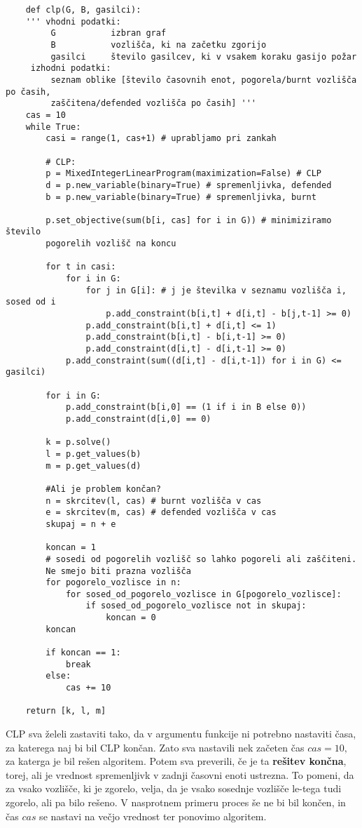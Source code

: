 \documentclass[a4paper, 12pt]{article}
\begin{document}
\overfullrule=0pt
\begin{verbatim}
    def clp(G, B, gasilci):
    ''' vhodni podatki:
         G           izbran graf
         B           vozlišča, ki na začetku zgorijo
         gasilci     število gasilcev, ki v vsakem koraku gasijo požar
     izhodni podatki:
         seznam oblike [število časovnih enot, pogorela/burnt vozlišča po časih, 
         zaščitena/defended vozlišča po časih] '''
    cas = 10
    while True:
        casi = range(1, cas+1) # uprabljamo pri zankah
    
        # CLP:
        p = MixedIntegerLinearProgram(maximization=False) # CLP
        d = p.new_variable(binary=True) # spremenljivka, defended
        b = p.new_variable(binary=True) # spremenljivka, burnt

        p.set_objective(sum(b[i, cas] for i in G)) # minimiziramo število 
        pogorelih vozlišč na koncu 

        for t in casi:
            for i in G:
                for j in G[i]: # j je številka v seznamu vozlišča i, sosed od i
                    p.add_constraint(b[i,t] + d[i,t] - b[j,t-1] >= 0)
                p.add_constraint(b[i,t] + d[i,t] <= 1)
                p.add_constraint(b[i,t] - b[i,t-1] >= 0)
                p.add_constraint(d[i,t] - d[i,t-1] >= 0)
            p.add_constraint(sum((d[i,t] - d[i,t-1]) for i in G) <= gasilci)

        for i in G:
            p.add_constraint(b[i,0] == (1 if i in B else 0))
            p.add_constraint(d[i,0] == 0)
            
        k = p.solve()
        l = p.get_values(b)
        m = p.get_values(d)
        
        #Ali je problem končan?
        n = skrcitev(l, cas) # burnt vozlišča v cas
        e = skrcitev(m, cas) # defended vozlišča v cas
        skupaj = n + e
        
        koncan = 1
        # sosedi od pogorelih vozlišč so lahko pogoreli ali zaščiteni.
        Ne smejo biti prazna vozlišča
        for pogorelo_vozlisce in n:
            for sosed_od_pogorelo_vozlisce in G[pogorelo_vozlisce]:
                if sosed_od_pogorelo_vozlisce not in skupaj:
                    koncan = 0
        koncan
        
        if koncan == 1:
            break
        else:
            cas += 10
        
    return [k, l, m]
\end{verbatim}

CLP sva želeli zastaviti tako, da v argumentu funkcije ni potrebno nastaviti časa,
za katerega naj bi bil CLP končan. Zato sva nastavili nek začeten čas $cas = 10,$ za katerga 
je bil rešen algoritem. Potem sva preverili, če je ta \textbf{rešitev končna}, 
torej, ali je vrednost spremenljivk v zadnji časovni enoti ustrezna.
To pomeni, da za vsako vozlišče, ki je zgorelo, velja, da je vsako sosednje
vozlišče le-tega tudi zgorelo, ali pa bilo rešeno. V nasprotnem primeru 
proces še ne bi bil končen, in čas $cas$ se nastavi na večjo vrednost ter
ponovimo algoritem. \pagebreak
\end{document}
